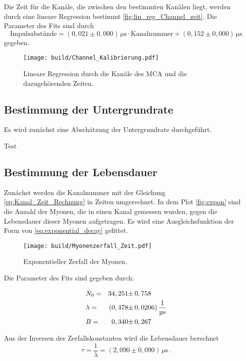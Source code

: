 Die Zeit für die Kanäle, die zwischen den bestimmten Kanälen liegt, werden durch eine lineare Regression bestimmt \autoref{fig:lin_reg_Channel_zeit}.
Die Parameter des Fits sind durch 
\begin{equation*}
    \text{Impulsabstände} = \left(0,021 \pm 0,000 \right) \,\unit{\micro\second} \cdot  \text{Kanalnummer} + \left(0,152 \pm 0,000 \right) \,\unit{\micro\second}
    \label{eq:Kanal_Zeit_Rechnung}
\end{equation*}
gegeben.

\begin{figure}[H]
    \centering
    \texttt{[image: build/Channel\_Kalibrierung.pdf]}
    \caption{Lineare Regression durch die Kanäle des MCA und die dazugehörenden Zeiten.}
    \label{fig:lin_reg_Channel_zeit}
\end{figure}

\subsection{Bestimmung der Untergrundrate}
\label{sec:Bes_Unt}
Es wird zunächst eine Abschätzung der Untergrundrate durchgeführt.

Test



\subsection{Bestimmung der Lebensdauer}
\label{sec:Bes_Leb}

Zunächst werden die Kanalnummer mit der Gleichung \autoref{eq:Kanal_Zeit_Rechnung} in Zeiten umgerechnet.
In dem Plot \autoref{fig:expon} sind die Anzahl der Myonen, die in einen Kanal gemessen wurden, gegen die Lebensdauer dieser Myonen aufgetragen.
Es wird eine Ausgleichsfunktion der Form von \autoref{eq:exponential_decay} gefittet.

\begin{figure}[H]
    \centering
    \texttt{[image: build/Myonenzerfall\_Zeit.pdf]}
    \caption{Exponentieller Zerfall der Myonen.}
    \label{fig:expon}
\end{figure}

Die Parameter des Fits sind gegeben durch:

\begin{align*}
    &N_0         =& 34,251 \pm& \, 0,758                                 \\
    &\lambda     =& (0,478 \pm& \, 0,0206)  \, \unit{\dfrac{1}{\micro\second}} \\
    &B           =& 0,340  \pm& \, 0,267
\end{align*}

Aus der Inversen der Zerfallskonstanten wird die Lebensdauer berechnet
\begin{equation*}
    \tau = \dfrac{1}{\lambda} = \left(2,090  \pm 0,090 \right) \,\unit{\micro\second} \,.
\end{equation*}
